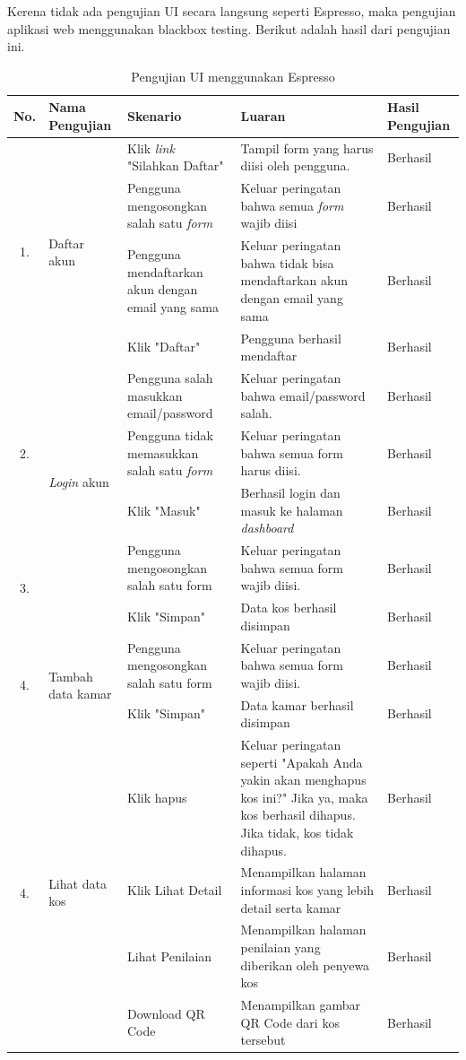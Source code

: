 	Kerena tidak ada pengujian UI secara langsung seperti Espresso, maka pengujian aplikasi web menggunakan blackbox testing. Berikut adalah hasil dari pengujian ini.
	
	\begin{longtable}{ |c|p{3cm}|p{3cm}|p{3cm}|p{2cm}|}
		\caption{Pengujian UI menggunakan Espresso}
		\label{ujiWeb} \\
		\hline
		No. & Nama Pengujian & Skenario & Luaran & Hasil Pengujian \\ \hline
		\multirow{4}{*}{1.} & 	\multirow{4}{*}{Daftar akun} & Klik \textit{link} "Silahkan Daftar" & Tampil form yang harus diisi oleh pengguna. & Berhasil \\ \cline{3-5}
		& & Pengguna mengosongkan salah satu \textit{form} & Keluar peringatan bahwa semua \textit{form} wajib diisi & Berhasil \\ \cline{3-5}
		& & Pengguna mendaftarkan akun dengan email yang sama & Keluar peringatan bahwa tidak bisa mendaftarkan akun dengan email yang sama & Berhasil \\ \cline{3-5}
		& & Klik "Daftar" & Pengguna berhasil mendaftar & Berhasil \\ \hline
		
		\multirow{3}{*}{2.} & 	\multirow{4}{*}{\textit{Login} akun} & Pengguna salah masukkan email/password & Keluar peringatan bahwa email/password salah. & Berhasil \\ \cline{3-5}
		& & Pengguna tidak memasukkan salah satu \textit{form} & Keluar peringatan bahwa semua form harus diisi. & Berhasil \\ \cline{3-5}
		& & Klik "Masuk" & Berhasil login dan masuk ke halaman \textit{dashboard} & Berhasil \\ \hline
		
		\multirow{2}{*}{3.} & 	\multirow{2}{*}{Tambah data kos} & Pengguna mengosongkan salah satu form & Keluar peringatan bahwa semua form wajib diisi. & Berhasil \\ \cline{3-5}
		&& Klik "Simpan" & Data kos berhasil disimpan & Berhasil \\ \hline
		
		\multirow{2}{*}{4.} & 	\multirow{2}{*}{Tambah data kamar} & Pengguna mengosongkan salah satu form & Keluar peringatan bahwa semua form wajib diisi. & Berhasil \\ \cline{3-5}
		&& Klik "Simpan" & Data kamar berhasil disimpan & Berhasil \\ \hline
		
		\multirow{4}{*}{4.} & 	\multirow{4}{*}{Lihat data kos} & Klik hapus & Keluar peringatan seperti "Apakah Anda yakin akan menghapus kos ini?" Jika ya, maka kos berhasil dihapus. Jika tidak, kos tidak dihapus. & Berhasil \\ \cline{3-5}
		&& Klik Lihat Detail & Menampilkan halaman informasi kos yang lebih detail serta kamar & Berhasil \\ \cline{3-5}
		&& Lihat Penilaian & Menampilkan halaman penilaian yang diberikan oleh penyewa kos & Berhasil \\ \cline{3-5}
		&& Download QR Code & Menampilkan gambar QR Code dari kos tersebut & Berhasil \\ \hline
		

\end{longtable}
